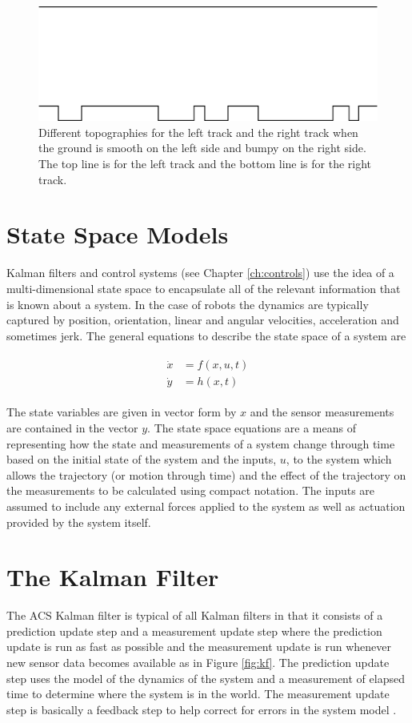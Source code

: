 \begin{figure}[ht!]
	\centering
	\includegraphics[width=.5\textwidth]{images/topography}
	\caption{Different topographies for the left track and the right track when the ground is smooth on the left side and bumpy on the right side. The top line is for the left track and the bottom line is for the right track.}
	\label{fig:topography}
\end{figure}

\section{State Space Models}
\label{sec:statespacemodels}
Kalman filters and control systems (see Chapter \ref{ch:controls}) use the idea of a multi-dimensional state space to encapsulate all of the relevant information that is known about a system. In the case of robots the dynamics are typically captured by position, orientation, linear and angular velocities, acceleration and sometimes jerk. The general equations to describe the state space of a system are

\begin{align}
\label{eq:statespace}
\begin{split}
\dot{x} &= f(x,u,t) \\
\dot{y} &= h(x,t)
\end{split}
\end{align}

The state variables are given in vector form by $x$ and the sensor measurements are contained in the vector $y$. The state space equations are a means of representing how the state and measurements of a system change through time based on the initial state of the system and the inputs, $u$, to the system which allows the trajectory (or motion through time) and the effect of the trajectory on the measurements to be calculated using compact notation. The inputs are assumed to include any external forces applied to the system as well as actuation provided by the system itself.

\section{The Kalman Filter}
\label{sec:kalmanfilter}
The ACS Kalman filter is typical of all Kalman filters in that it consists of a prediction update step and a measurement update step where the prediction update is run as fast as possible and the measurement update is run whenever new sensor data becomes available as in Figure \ref{fig:kf}. The prediction update step uses the model of the dynamics of the system and a measurement of elapsed time to determine where the system is in the world. The measurement update step is basically a feedback step to help correct for errors in the system model \cite{Kelly_1994_338}.

